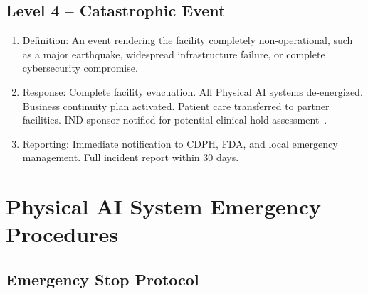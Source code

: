 \documentclass[11pt,letterpaper]{article}
\begin{document}
\subsection{Level 4 -- Catastrophic Event}

\begin{enumerate}[label=(\alph*)]
\item Definition: An event rendering the facility completely non-operational,
  such as a major earthquake, widespread infrastructure failure, or complete
  cybersecurity compromise.

\item Response: Complete facility evacuation. All Physical AI systems
  de-energized. Business continuity plan activated. Patient care transferred
  to partner facilities. IND sponsor notified for potential clinical
  hold assessment~\cite{cfr312adapt}.

\item Reporting: Immediate notification to CDPH, FDA, and local emergency
  management. Full incident report within 30 days.
\end{enumerate}

\section{Physical AI System Emergency Procedures}

\subsection{Emergency Stop Protocol}
\end{document}
